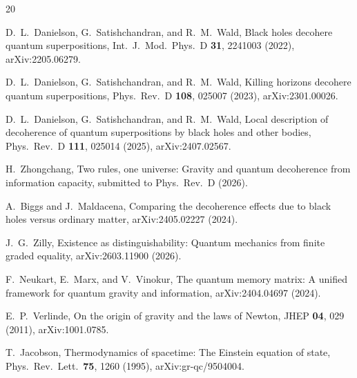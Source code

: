 \documentclass[aps,prl,twocolumn,showpacs,superscriptaddress,preprintnumbers]{revtex4-2}
\begin{document}
\begin{thebibliography}{20}

D.~L.~Danielson, G.~Satishchandran, and R.~M.~Wald,
Black holes decohere quantum superpositions,
Int.\ J.\ Mod.\ Phys.\ D \textbf{31}, 2241003 (2022),
arXiv:2205.06279.

D.~L.~Danielson, G.~Satishchandran, and R.~M.~Wald,
Killing horizons decohere quantum superpositions,
Phys.\ Rev.\ D \textbf{108}, 025007 (2023),
arXiv:2301.00026.

D.~L.~Danielson, G.~Satishchandran, and R.~M.~Wald,
Local description of decoherence of quantum superpositions by black holes and other bodies,
Phys.\ Rev.\ D \textbf{111}, 025014 (2025),
arXiv:2407.02567.

H.~Zhongchang,
Two rules, one universe: Gravity and quantum decoherence from information capacity,
submitted to Phys.\ Rev.\ D (2026).

A.~Biggs and J.~Maldacena,
Comparing the decoherence effects due to black holes versus ordinary matter,
arXiv:2405.02227 (2024).

J.~G.~Zilly,
Existence as distinguishability: Quantum mechanics from finite graded equality,
arXiv:2603.11900 (2026).

F.~Neukart, E.~Marx, and V.~Vinokur,
The quantum memory matrix: A unified framework for quantum gravity and information,
arXiv:2404.04697 (2024).

E.~P.~Verlinde,
On the origin of gravity and the laws of Newton,
JHEP \textbf{04}, 029 (2011),
arXiv:1001.0785.

T.~Jacobson,
Thermodynamics of spacetime: The Einstein equation of state,
Phys.\ Rev.\ Lett.\ \textbf{75}, 1260 (1995),
arXiv:gr-qc/9504004.

\end{thebibliography}
\end{document}

